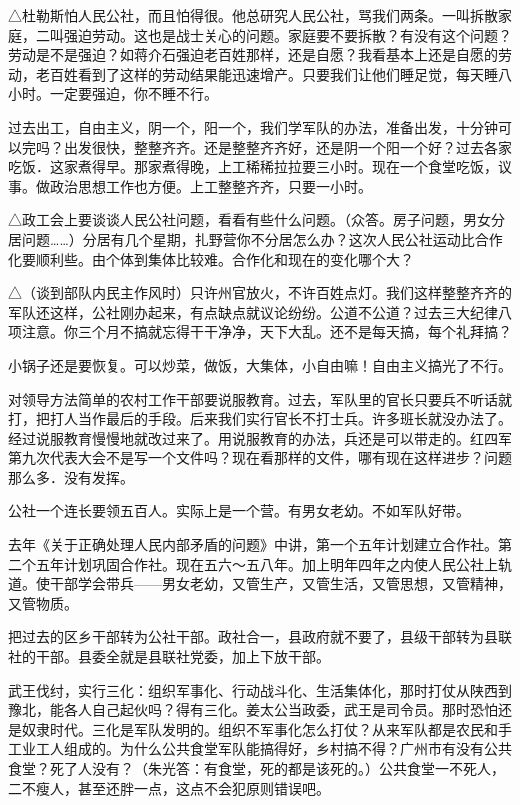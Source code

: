 △杜勒斯怕人民公社，而且怕得很。他总研究人民公社，骂我们两条。一叫拆散家庭，二叫强迫劳动。这也是战士关心的问题。家庭要不要拆散？有没有这个问题？劳动是不是强迫？如蒋介石强迫老百姓那样，还是自愿？我看基本上还是自愿的劳动，老百姓看到了这样的劳动结果能迅速增产。只要我们让他们睡足觉，每天睡八小时。一定要强迫，你不睡不行。

过去出工，自由主义，阴一个，阳一个，我们学军队的办法，准备出发，十分钟可以完吗？出发很快，整整齐齐。还是整整齐齐好，还是阴一个阳一个好？过去各家吃饭．这家煮得早。那家煮得晚，上工稀稀拉拉要三小时。现在一个食堂吃饭，议事。做政治思想工作也方便。上工整整齐齐，只要一小时。

△政工会上要谈谈人民公社问题，看看有些什么问题。（众答。房子问题，男女分居问题……）分居有几个星期，扎野营你不分居怎么办？这次人民公社运动比合作化要顺利些。由个体到集体比较难。合作化和现在的变化哪个大？

△（谈到部队内民主作风时）只许州官放火，不许百姓点灯。我们这样整整齐齐的军队还这样，公社刚办起来，有点缺点就议论纷纷。公道不公道？过去三大纪律八项注意。你三个月不搞就忘得干干净净，天下大乱。还不是每天搞，每个礼拜搞？

小锅子还是要恢复。可以炒菜，做饭，大集体，小自由嘛！自由主义搞光了不行。

对领导方法简单的农村工作干部要说服教育。过去，军队里的官长只要兵不听话就打，把打人当作最后的手段。后来我们实行官长不打士兵。许多班长就没办法了。经过说服教育慢慢地就改过来了。用说服教育的办法，兵还是可以带走的。红四军第九次代表大会不是写一个文件吗？现在看那样的文件，哪有现在这样进步？问题那么多．没有发挥。

公社一个连长要领五百人。实际上是一个营。有男女老幼。不如军队好带。

去年《关于正确处理人民内部矛盾的问题》中讲，第一个五年计划建立合作社。第二个五年计划巩固合作社。现在五六～五八年。加上明年四年之内使人民公社上轨道。使干部学会带兵——男女老幼，又管生产，又管生活，又管思想，又管精神，又管物质。

把过去的区乡干部转为公社干部。政社合一，县政府就不要了，县级干部转为县联社的干部。县委全就是县联社党委，加上下放干部。

武王伐纣，实行三化：组织军事化、行动战斗化、生活集体化，那时打仗从陕西到豫北，能各人自己起伙吗？得有三化。姜太公当政委，武王是司令员。那时恐怕还是奴隶时代。三化是军队发明的。组织不军事化怎么打仗？从来军队都是农民和手工业工人组成的。为什么公共食堂军队能搞得好，乡村搞不得？广州市有没有公共食堂？死了人没有？（朱光答：有食堂，死的都是该死的。）公共食堂一不死人，二不瘦人，甚至还胖一点，这点不会犯原则错误吧。

